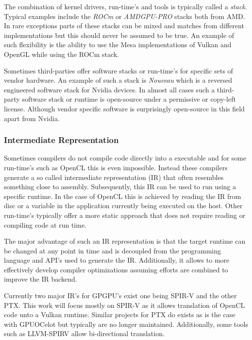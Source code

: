 \documentclass[conference]{IEEEtran}
\begin{document}
The combination of kernel drivers, run-time's and tools is typically called a
\textit{stack}. Typical examples include the \textit{ROCm} or
\textit{AMDGPU-PRO} stacks both from AMD. In rare exceptions parts of these
stacks can be mixed and matches from different implementations but this
should never be assumed to be true. An example of such flexibility is the
ability to use the Mesa implementations of Vulkan and OpenGL while using the
ROCm stack.

Sometimes third-parties offer software stacks or run-time's for specific
sets of vendor hardware. An example of such a stack is \textit{Nouveau} which
is a reversed engineered software stack for Nvidia devices. In almost all cases
such a third-party software stack or runtime is open-source under a permissive
or copy-left license. Although vendor specific software is surprisingly
open-source in this field apart from Nvidia.

\subsubsection*{Intermediate Representation}

Sometimes compilers do not compile code directly into a executable and for some
run-time's such as OpenCL this is even impossible. Instead these compilers
generate a so called intermediate representation (IR) that often resembles
something close to assembly. Subsequently, this IR can be used to run using a
specific runtime. In the case of OpenCL this is achieved by reading the IR from
disc or a variable in the application currently being executed on the host.
Other run-time's typically offer a more static approach that does not require
reading or compiling code at run time\footnotemark[6].


The major advantage of such an IR representation is that the target runtime can
be changed at any point in time and is decoupled from the programming language
and API's used to generate the IR. Additionally, it allows to more effectively
develop compiler optimizations assuming efforts are combined to improve the IR
backend.

Currently two major IR's for GPGPU's exist one being SPIR-V and the
other PTX. This work will focus mostly on SPIR-V as it allows translation of
OpenCL code unto a Vulkan runtime. Similar projects for PTX do exists as is the
case with GPUOCelot\cite{tired-manycore-architectures-ocelot} but typically are
no longer maintained. Additionally, some tools such as LLVM-SPIRV allow
bi-directional translation.
\end{document}
